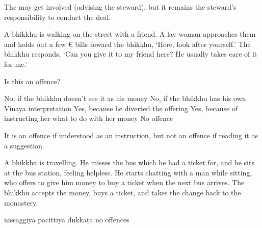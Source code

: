 \begin{exam}{\autoExamName}
\begin{problem*}
\begin{parts}
      \begin{solution}
        The may get involved (advising the steward), but it remains the
        steward's responsibility to conduct the deal.
      \end{solution}

    \end{parts}

  \end{problem*}

  \problemDivide

  \begin{problem}

    A bhikkhu is walking on the street with a friend. A lay woman approaches
    them and holds out a few € bills toward the bhikkhu, `Here, look after
    yourself.' The bhikkhu responds, `Can you give it to my friend here? He
    usually takes care of it for me.'

    \bigskip

    Is this an offence?

    \bigskip

    \begin{answers}{1}
      \bChoices
       No, if the bhikkhu doesn't see it as his money\eAns
       No, if the bhikkhu has his own Vinaya interpretation\eAns
       Yes, because he diverted the offering\eAns
       Yes, because of instructing her what to do with her money\eAns
       No offence\eAns
      \eChoices
    \end{answers}

    \begin{solution}
      It is an offence if understood as an instruction, but not an offence if
      reading it as a suggestion.
    \end{solution}

  \end{problem}

  \problemDivide

  \begin{problem}
    A bhikkhu is travelling. He misses the bus which he had a ticket for, and he
    sits at the bus station, feeling helpless. He starts chatting with a man
    while sitting, who offers to give him money to buy a ticket when the next
    bus arrives. The bhikkhu accepts the money, buys a ticket, and takes the
    change back to the monastery.
  \end{problem}

  \bigskip

    \begin{answers}{3}
      \bChoices
       nissaggiya pācittiya\eAns
       dukkaṭa\eAns
       no offences\eAns
      \eChoices
    \end{answers}


\end{exam}
